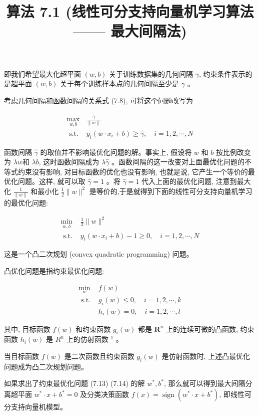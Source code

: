 \documentclass[10pt]{article}
\title{算法 7.1 (线性可分支持向量机学习算法—— 最大间隔法) }
\author{}
\date{}
\begin{document}
\maketitle
即我们希望最大化超平面 $(w, b)$ 关于训练数据集的几何间隔 $\gamma$, 约束条件表示的是超平面 $(w, b)$ 关于每个训练样本点的几何间隔至少是 $\gamma$ 。

考虑几何间隔和函数间隔的关系式 (7.8), 可将这个问题改写为

\[
\begin{array}{ll}
\max _{w, b} & \frac{\hat{\gamma}}{\|w\|} \\
\text { s.t. } & y_{i}\left(w \cdot x_{i}+b\right) \geqslant \hat{\gamma}, \quad i=1,2, \cdots, N \tag{7.12}
\end{array}
\]

函数间隔 $\hat{\gamma}$ 的取值并不影响最优化问题的解。事实上, 假设将 $w$ 和 $b$ 按比例改变为 $\lambda w$和 $\lambda b$, 这时函数间隔成为 $\lambda \hat{\gamma}$ 。函数间隔的这一改变对上面最优化问题的不等式约束没有影响, 对目标函数的优化也没有影响, 也就是说, 它产生一个等价的最优化问题。这样, 就可以取 $\hat{\gamma}=1$ 。将 $\hat{\gamma}=1$ 代入上面的最优化问题, 注意到最大化 $\frac{1}{\|w\|}$ 和最小化 $\frac{1}{2}\|w\|^{2}$ 是等价的,于是就得到下面的线性可分支持向量机学习的最优化问题:

\[
\begin{array}{ll}
\min _{w, b} & \frac{1}{2}\|w\|^{2} \\
\text { s.t. } & y_{i}\left(w \cdot x_{i}+b\right)-1 \geqslant 0, \quad i=1,2, \cdots, N \tag{7.14}
\end{array}
\]

这是一个凸二次规划 (convex quadratic programming) 问题。

凸优化问题是指约束最优化问题:

\[
\begin{array}{ll}
\min _{w} & f(w) \\
\text { s.t. } & g_{i}(w) \leqslant 0, \quad i=1,2, \cdots, k \\
& h_{i}(w)=0, \quad i=1,2, \cdots, l \tag{7.17}
\end{array}
\]

其中, 目标函数 $f(w)$ 和约束函数 $g_{i}(w)$ 都是 $\boldsymbol{R}^{n}$ 上的连续可微的凸函数, 约束函数 $h_{i}(w)$ 是 $R^{n}$ 上的仿射函数 ${ }^{1}$ 。

当目标函数 $f(w)$ 是二次函数且约束函数 $g_{i}(w)$ 是仿射函数时, 上述凸最优化问题成为凸二次规划问题。

如果求出了约束最优化问题 (7.13) (7.14) 的解 $w^{*}, b^{*}$, 那么就可以得到最大间隔分离超平面 $w^{*} \cdot x+b^{*}=0$ 及分类决策函数 $f(x)=\operatorname{sign}\left(w^{*} \cdot x+b^{*}\right)$, 即线性可分支持向量机模型。
\end{document}
